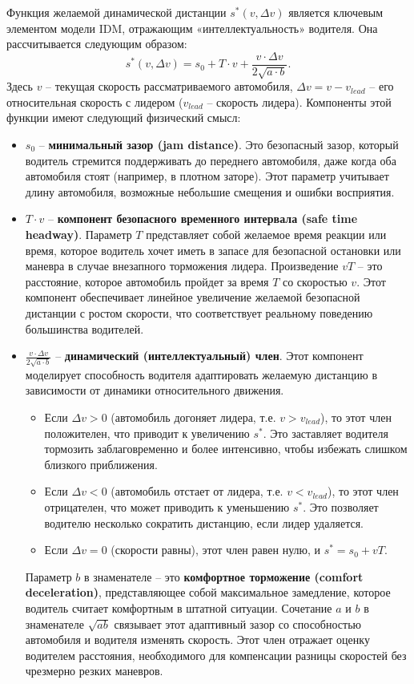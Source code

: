 \documentclass[12pt, a4paper]{article}
\begin{document}
Функция желаемой динамической дистанции $s^*(v, \Delta v)$ является ключевым элементом модели IDM, отражающим «интеллектуальность» водителя. Она рассчитывается следующим образом:
\begin{equation}
\label{eq:s_star_idm}
s^*(v, \Delta v) = s_0 + T \cdot v + \frac{v \cdot \Delta v}{2 \sqrt{a \cdot b}}.
\end{equation}
Здесь $v$ – текущая скорость рассматриваемого автомобиля, $\Delta v = v - v_{lead}$ – его относительная скорость с лидером ($v_{lead}$ – скорость лидера).
Компоненты этой функции имеют следующий физический смысл:
\begin{itemize}
    \item $s_0$ – \textbf{минимальный зазор (jam distance)}. Это безопасный зазор, который водитель стремится поддерживать до переднего автомобиля, даже когда оба автомобиля стоят (например, в плотном заторе). Этот параметр учитывает длину автомобиля, возможные небольшие смещения и ошибки восприятия.
    \item $T \cdot v$ – \textbf{компонент безопасного временного интервала (safe time headway)}. Параметр $T$ представляет собой желаемое время реакции или время, которое водитель хочет иметь в запасе для безопасной остановки или маневра в случае внезапного торможения лидера. Произведение $vT$ – это расстояние, которое автомобиль пройдет за время $T$ со скоростью $v$. Этот компонент обеспечивает линейное увеличение желаемой безопасной дистанции с ростом скорости, что соответствует реальному поведению большинства водителей.
    \item $\frac{v \cdot \Delta v}{2 \sqrt{a \cdot b}}$ – \textbf{динамический (интеллектуальный) член}. Этот компонент моделирует способность водителя адаптировать желаемую дистанцию в зависимости от динамики относительного движения.
    \begin{itemize}
        \item Если $\Delta v > 0$ (автомобиль догоняет лидера, т.е. $v > v_{lead}$), то этот член положителен, что приводит к увеличению $s^*$. Это заставляет водителя тормозить заблаговременно и более интенсивно, чтобы избежать слишком близкого приближения.
        \item Если $\Delta v < 0$ (автомобиль отстает от лидера, т.е. $v < v_{lead}$), то этот член отрицателен, что может приводить к уменьшению $s^*$. Это позволяет водителю несколько сократить дистанцию, если лидер удаляется.
        \item Если $\Delta v = 0$ (скорости равны), этот член равен нулю, и $s^* = s_0 + vT$.
    \end{itemize}
    Параметр $b$ в знаменателе – это \textbf{комфортное торможение (comfort deceleration)}, представляющее собой максимальное замедление, которое водитель считает комфортным в штатной ситуации. Сочетание $a$ и $b$ в знаменателе $\sqrt{ab}$ связывает этот адаптивный зазор со способностью автомобиля и водителя изменять скорость. Этот член отражает оценку водителем расстояния, необходимого для компенсации разницы скоростей без чрезмерно резких маневров.
\end{itemize}
\end{document}
